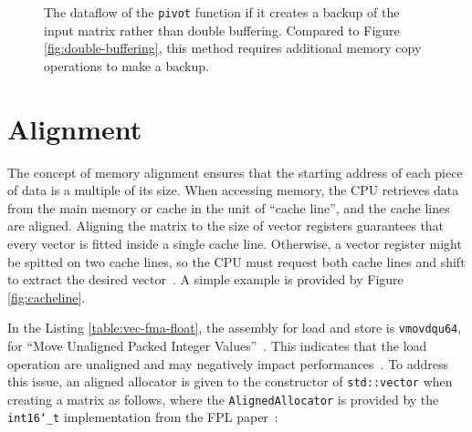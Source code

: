 \documentclass[logo,bsc,singlespacing,parskip]{infthesis}
\newcommand{\dtshort}{\texttt{int16\char`_t}}
\newcommand{\pivot}{\texttt{pivot}}
\begin{document}
\begin{figure}
\centering
{}
\caption{The dataflow of the \pivot{} function if it creates a backup of the input matrix rather than double buffering. Compared to Figure \ref{fig:double-buffering}, this method requires additional memory copy operations to make a backup.}
\label{fig:single-buffering}
\end{figure}


\section{Alignment}


The concept of memory alignment ensures that the starting address of each piece of data is a multiple of its size. When accessing memory, the CPU retrieves data from the main memory or cache in the unit of ``cache line'', and the cache lines are aligned. Aligning the matrix to the size of vector registers guarantees that every vector is fitted inside a single cache line. Otherwise, a vector register might be spitted on two cache lines, so the CPU must request both cache lines and shift to extract the desired vector~\cite{Unaligned}. A simple example is provided by Figure \ref{fig:cacheline}.


In the Listing \ref{table:vec-fma-float}, the assembly for load and store is \texttt{vmovdqu64}, for ``Move Unaligned Packed Integer Values''~\cite{instruction}. This indicates that the load operation are unaligned and may negatively impact performances~\cite{Unaligned}. To address this issue, an aligned allocator is given to the constructor of \texttt{std::vector} when creating a matrix as follows, where the \texttt{AlignedAllocator} is provided by the \dtshort{} implementation from the FPL paper~\cite{FPL2}:
\end{document}
